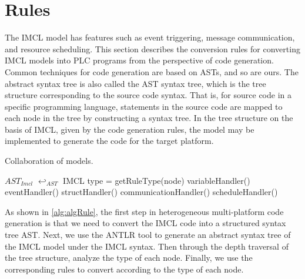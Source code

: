 \section{Rules}
The IMCL model has features such as event triggering, message communication, and resource scheduling. This section describes the conversion rules for converting IMCL models into PLC programs from the perspective of code generation. Common techniques for code generation are based on ASTs, and so are ours. The abstract syntax tree is also called the AST syntax tree, which is the tree structure corresponding to the source code syntax. That is, for source code in a specific programming language, statements in the source code are mapped to each node in the tree by constructing a syntax tree. In the tree structure on the basis of IMCL, given by the code generation rules, the model may be implemented to generate the code for the target platform.

\begin{algorithm}[htb!]
\small
\label{alg:algRule}
    \caption{Collaboration of models.}
    \BlankLine
    \BlankLine
    \BlankLine

    $AST_{Imcl}$ $\hookleftarrow_{AST}$ IMCL \;
    {
        {
            type = getRuleType(node) \;
            {
                variableHandler()\;
            }
            {
                eventHandler()\;
            }
            {
                structHandler()\;
            }
            {
                communicationHandler()\;
            }
            {
                scheduleHandler()\;
            }
        }
    }
\end{algorithm}


As shown in \ref{alg:algRule}, the first step in heterogeneous multi-platform code generation is that we need to convert the IMCL code into a structured syntax tree AST. Next, we use the ANTLR tool to generate an abstract syntax tree of the IMCL model under the IMCL syntax. Then through the depth traversal of the tree structure, analyze the type of each node. Finally, we use the corresponding rules to convert according to the type of each node. \


